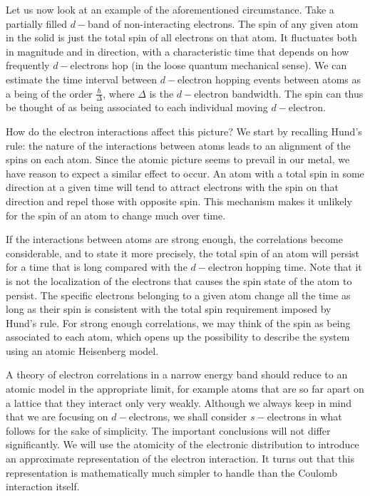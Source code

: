 \documentclass[10pt, twocolumn, twoside]{article}
\begin{document}
Let us now look at an example of the aforementioned circumstance. Take a partially filled $d-$band of non-interacting electrons. The spin of any given atom in the solid is just the total spin of all electrons on that atom. It fluctuates both in magnitude and in direction, with a characteristic time that depends on how frequently $d-$electrons hop (in the loose quantum mechanical sense). We can estimate the time interval between $d-$electron hopping events between atoms as a being of the order $\frac{\hbar}{\Delta}$, where $\Delta$ is the $d-$electron bandwidth. The spin can thus be thought of as being associated to each individual moving $d-$electron.

How do the electron interactions affect this picture? We start by recalling Hund's rule: the nature of the  interactions between atoms leads to an alignment of the spins on each atom. Since the atomic picture seems to prevail in our metal, we have reason to expect a similar effect to occur. An atom with a total spin in some direction at a given time will tend to attract electrons with the spin on that direction and repel those with opposite spin. This mechanism makes it unlikely for the spin of an atom to change much over time.

If the interactions between atoms are strong enough, the correlations become considerable, and to state it more precisely, the total spin of an atom will persist for a time that is long compared with the $d-$electron hopping time. Note that it is not the localization of the electrons that causes the spin state of the atom to persist. The specific electrons belonging to a given atom change all the time as long as their spin is consistent with the total spin requirement imposed by Hund's rule. For strong enough correlations, we may think of the spin as being associated to each atom, which opens up the possibility to describe the system using an atomic Heisenberg model.

A theory of electron correlations in a narrow energy band should reduce to an atomic model in the appropriate limit, for example atoms that are so far apart on a lattice that they interact only very weakly. Although we always keep in mind that we are focusing on $d-$electrons, we shall consider $s-$electrons in what follows for the sake of simplicity. The important conclusions will not differ significantly. We will use the atomicity of the electronic distribution to introduce an approximate representation of the electron interaction. It turns out that this representation is mathematically much simpler to handle than the Coulomb interaction itself.
\end{document}
